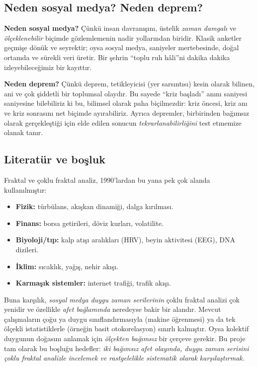 \documentclass[11pt,a4paper]{article}
\begin{document}
\subsection{Neden sosyal medya? Neden deprem?}

\textbf{Neden sosyal medya?} Çünkü insan davranışını, üstelik \emph{zaman
damgalı} ve \emph{ölçeklenebilir} biçimde gözlemlemenin nadir yollarından
biridir. Klasik anketler geçmişe dönük ve seyrektir; oysa sosyal medya,
saniyeler mertebesinde, doğal ortamda ve sürekli veri üretir. Bir şehrin
``toplu ruh hâli''ni dakika dakika izleyebileceğimiz bir kayıttır.

\textbf{Neden deprem?} Çünkü deprem, tetikleyicisi (yer sarsıntısı) kesin
olarak bilinen, ani ve çok şiddetli bir toplumsal olaydır. Bu sayede
``kriz başladı'' anını saniyesi saniyesine bilebiliriz ki bu, bilimsel olarak
paha biçilmezdir: kriz öncesi, kriz anı ve kriz sonrasını net biçimde
ayırabiliriz. Ayrıca depremler, birbirinden bağımsız olarak gerçekleştiği için
elde edilen sonucun \emph{tekrarlanabilirliğini} test etmemize olanak tanır.

\subsection{Literatür ve boşluk}

Fraktal ve çoklu fraktal analiz, 1990'lardan bu yana pek çok alanda
kullanılmıştır:
\begin{itemize}[leftmargin=1.4em]
  \item \textbf{Fizik:} türbülans, akışkan dinamiği, dalga kırılması.
  \item \textbf{Finans:} borsa getirileri, döviz kurları, volatilite.
  \item \textbf{Biyoloji/tıp:} kalp atışı aralıkları (HRV), beyin
        aktivitesi (EEG), DNA dizileri.
  \item \textbf{İklim:} sıcaklık, yağış, nehir akışı.
  \item \textbf{Karmaşık sistemler:} internet trafiği, trafik akışı.
\end{itemize}

Buna karşılık, \emph{sosyal medya duygu zaman serilerinin} çoklu fraktal
analizi çok yenidir ve özellikle \emph{afet bağlamında} neredeyse bakir bir
alandır. Mevcut çalışmaların çoğu ya duygu sınıflandırmasıyla (makine
öğrenmesi) ya da tek ölçekli istatistiklerle (örneğin basit otokorelasyon)
sınırlı kalmıştır. Oysa kolektif duygunun doğasını anlamak için
\emph{ölçekten bağımsız} bir çerçeve gerekir. Bu proje tam olarak bu boşluğu
hedefler: \emph{iki bağımsız afet olayında, duygu zaman serisini çoklu fraktal
analizle incelemek ve rastgelelikle sistematik olarak karşılaştırmak.}
\end{document}
